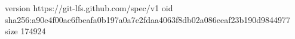 version https://git-lfs.github.com/spec/v1
oid sha256:a90e4f00ac6fbeafa0b197a0a7e2fdaa4063f8db02a086eeaf23b190d9844977
size 174924
